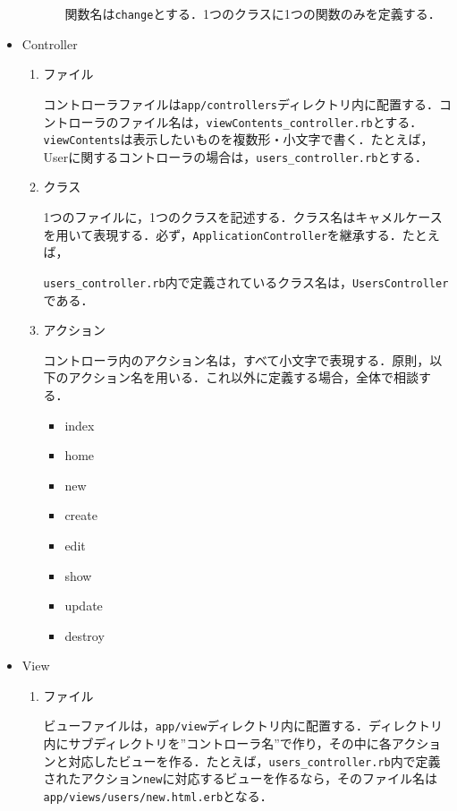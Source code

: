 \begin{itemize}
\begin{enumerate}
\begin{enumerate}
            関数名は\texttt{change}とする．1つのクラスに1つの関数のみを定義する．
        \end{enumerate}
    \end{enumerate}
    
    \item Controller
    \begin{enumerate}
        \item ファイル

        コントローラファイルは\texttt{app/controllers}ディレクトリ内に配置する．コントローラのファイル名は，\texttt{viewContents\_controller.rb}とする．\texttt{viewContents}は表示したいものを複数形・小文字で書く．たとえば，Userに関するコントローラの場合は，\texttt{users\_controller.rb}とする．
        \item クラス

        1つのファイルに，1つのクラスを記述する．クラス名はキャメルケースを用いて表現する．必ず，\texttt{ApplicationController}を継承する．たとえば，
        
        \texttt{users\_controller.rb}内で定義されているクラス名は，\texttt{UsersController}である．
        \item アクション

        コントローラ内のアクション名は，すべて小文字で表現する．原則，以下のアクション名を用いる．これ以外に定義する場合，全体で相談する．
        \begin{itemize}
            \item index
            \item home
            \item new
            \item create
            \item edit
            \item show
            \item update
            \item destroy
        \end{itemize}
    \end{enumerate}
    \item View
    \begin{enumerate}
        \item ファイル

        ビューファイルは，\texttt{app/view}ディレクトリ内に配置する．ディレクトリ内にサブディレクトリを”コントローラ名”で作り，その中に各アクションと対応したビューを作る．たとえば，\texttt{users\_controller.rb}内で定義されたアクション\texttt{new}に対応するビューを作るなら，そのファイル名は\texttt{app/views/users/new.html.erb}となる．
    \end{enumerate}
\end{itemize}

